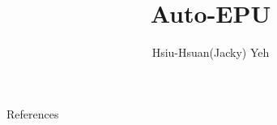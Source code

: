 \documentclass[12pt]{beamer}
\title{\huge{Auto-EPU}}
\author{Hsiu-Hsuan(Jacky) Yeh}
\date{}
\begin{document}
\maketitle


\begin{frame}{}
\end{frame}


\begin{frame}{References}

\end{frame}
\end{document}
